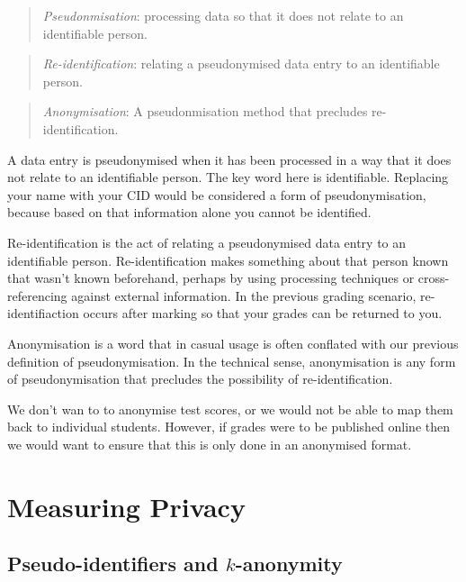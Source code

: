 \documentclass[
  12pt,
]{book}
\begin{document}
\begin{quote}
\emph{Pseudonmisation}: processing data so that it does not relate to an identifiable person.
\end{quote}

\begin{quote}
\emph{Re-identification}: relating a pseudonymised data entry to an identifiable person.
\end{quote}

\begin{quote}
\emph{Anonymisation}: A pseudonmisation method that precludes re-identification.
\end{quote}

A data entry is pseudonymised when it has been processed in a way that it does not relate to an identifiable person. The key word here is identifiable. Replacing your name with your CID would be considered a form of pseudonymisation, because based on that information alone you cannot be identified.

Re-identification is the act of relating a pseudonymised data entry to an identifiable person. Re-identification makes something about that person known that wasn't known beforehand, perhaps by using processing techniques or cross-referencing against external information. In the previous grading scenario, re-identifiaction occurs after marking so that your grades can be returned to you.

Anonymisation is a word that in casual usage is often conflated with our previous definition of pseudonymisation. In the technical sense, anonymisation is any form of pseudonymisation that precludes the possibility of re-identification.

We don't wan to to anonymise test scores, or we would not be able to map them back to individual students. However, if grades were to be published online then we would want to ensure that this is only done in an anonymised format.

\hypertarget{measuring-privacy}{%
\section{Measuring Privacy}\label{measuring-privacy}}

\hypertarget{pseudo-identifiers-and-k-anonymity}{%
\subsection{\texorpdfstring{Pseudo-identifiers and \(k\)-anonymity}{Pseudo-identifiers and k-anonymity}}\label{pseudo-identifiers-and-k-anonymity}}
\end{document}
